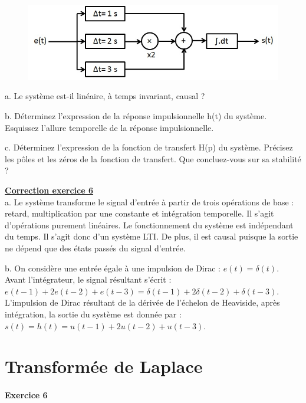 \documentclass[11pt]{report}
\begin{document}
 	\begin{figure}[h!]
 		\centering
 		\includegraphics[scale=0.5]{images/Exo_2_6.jpg} 
 	\end{figure}
 
 	a. Le système est-il linéaire, à temps invariant, causal ?
 	
 	b. Déterminez l'expression de la réponse impulsionnelle h(t) du système. Esquissez l'allure temporelle de la réponse impulsionnelle. 
 	
 	c. Déterminez l'expression de la fonction de transfert H(p) du système. Précisez les pôles et les zéros de la fonction de transfert. Que concluez-vous sur sa stabilité ?
 
 	\vspace{1\baselineskip}
 	
 		\textbf{\underline{Correction exercice 6}}\\
 	a. Le système transforme le signal d'entrée à partir de trois opérations de base : retard, multiplication par une constante et intégration temporelle. Il s'agit d'opérations purement linéaires. Le fonctionnement du système est indépendant du temps. Il s'agit donc d'un système LTI. De plus, il est causal puisque la sortie ne dépend que des états passés du signal d'entrée.
 	
 	b. On considère une entrée égale à une impulsion de Dirac : $e(t) = \delta(t)$.	Avant l'intégrateur, le signal résultant s'écrit : $e(t-1)+2e(t-2)+e(t-3)=\delta(t-1)+2\delta(t-2)+\delta(t-3)$. L'impulsion de Dirac résultant de la dérivée de l'échelon de Heaviside, après intégration, la sortie du système est donnée par : $s(t) = h(t) = u(t-1)+2u(t-2)+u(t-3)$.
 	
	
	\newpage
	
	\chapter{Transformée de Laplace}
	
	
	\subsubsection{Exercice 6}
	
\end{document}
